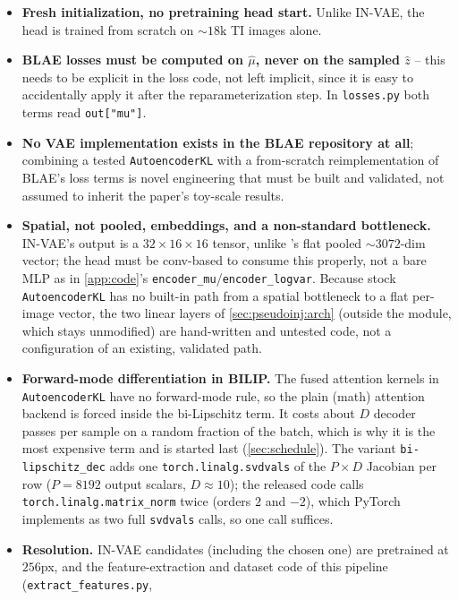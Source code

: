 \begin{itemize}[leftmargin=1.5em]
      precedent in the stock class to calibrate against.
\item \textbf{Fresh initialization, no pretraining head start.} Unlike IN-VAE, the head is trained from
      scratch on $\sim\!18\mathrm{k}$ TI images alone.
\item \textbf{BLAE losses must be computed on $\hat\mu$, never on the sampled $\hat z$} -- this needs to 
      be explicit in the loss code, not left implicit, since it is easy to accidentally apply it after 
      the reparameterization step. In \texttt{losses.py} both terms read \texttt{out["mu"]}.
\item \textbf{No VAE implementation exists in the BLAE repository at all}; combining a tested
      \texttt{AutoencoderKL} \cite{aekl} with a from-scratch reimplementation of BLAE's loss terms is 
      novel engineering that must be built and validated, not assumed to inherit the paper's toy-scale 
      results.
\item \textbf{Spatial, not pooled, embeddings, and a non-standard bottleneck.} IN-VAE's output is a
      $32\times16\times16$ tensor, unlike 's flat pooled $\sim\!3072$-dim vector; the
      head must be conv-based to consume this properly, not a bare MLP as in \cref{app:code}'s
      \texttt{encoder\_mu}/\texttt{encoder\_logvar}. Because stock \texttt{AutoencoderKL} \cite{aekl} 
      has no built-in path from a spatial bottleneck to a flat per-image vector, the two linear layers
      of \cref{sec:pseudoinj:arch} (outside the module, which stays unmodified) are hand-written and
      untested code, not a configuration of an existing, validated path.
\item \textbf{Forward-mode differentiation in BILIP.} The fused attention kernels in
      \texttt{AutoencoderKL} have no forward-mode rule, so the plain (math) attention backend is forced
      inside the bi-Lipschitz term. It costs about $D$ decoder passes per sample on a random fraction of
      the batch, which is why it is the most expensive term and is started last (\cref{sec:schedule}).
      The variant \texttt{bi-lipschitz\_dec} adds one \texttt{torch.linalg.svdvals} of the
      $P\times D$ Jacobian per row ($P=8192$ output scalars, $D\approx10$); the released
      code calls \texttt{torch.linalg.matrix\_norm} twice (orders $2$ and $-2$), which
      PyTorch implements as two full \texttt{svdvals} calls, so one call suffices.
\item \textbf{Resolution.} IN-VAE candidates (including the chosen one) are pretrained at 
      $256$px, and the feature-extraction and dataset code of this pipeline (\texttt{extract\_features.py},

\end{itemize}
